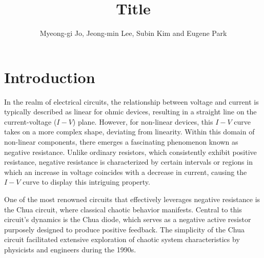 \documentclass[12pt]{article}
\begin{document}
\title{Title}
\author{Myeong-gi Jo, Jeong-min Lee, Subin Kim and Eugene Park}

\maketitle

\section{Introduction}
\noindent{}



In the realm of electrical circuits, the relationship between voltage and current is typically described as linear for ohmic devices, resulting in a straight line on the current-voltage (\(I-V\)) plane. However, for non-linear devices, this \(I-V\) curve takes on a more complex shape, deviating from linearity. Within this domain of non-linear components, there emerges a fascinating phenomenon known as negative resistance. Unlike ordinary resistors, which consistently exhibit positive resistance, negative resistance is characterized by certain intervals or regions in which an increase in voltage coincides with a decrease in current, causing the \(I-V\) curve to display this intriguing property.

One of the most renowned circuits that effectively leverages negative resistance is the Chua circuit, where classical chaotic behavior manifests. Central to this circuit's dynamics is the Chua diode, which serves as a negative active resistor purposely designed to produce positive feedback. The simplicity of the Chua circuit facilitated extensive exploration of chaotic system characteristics by physicists and engineers during the 1990s\cite{impact_chua}.
\end{document}
